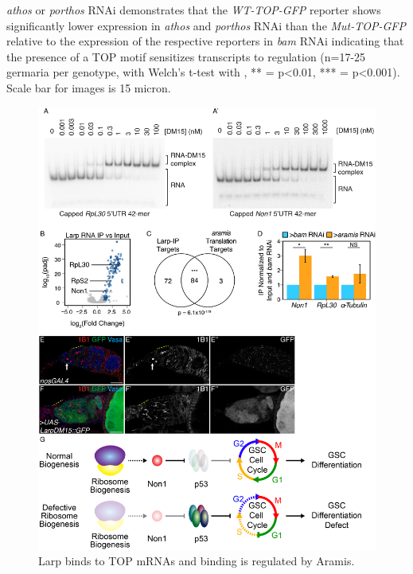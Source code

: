 \documentclass[12pt,oneside]{reedthesis}
\begin{document}
\emph{athos} or \emph{porthos} RNAi demonstrates that the \emph{WT-TOP-GFP} reporter
shows significantly lower expression in \emph{athos} and \emph{porthos} RNAi than
the \emph{Mut-TOP-GFP} relative to the expression of the respective reporters
in \emph{bam} RNAi indicating that the presence of a TOP motif sensitizes
transcripts to regulation (n=17-25 germaria per genotype, with Welch's
t-test with , ** = p\textless0.01, *** = p\textless0.001). Scale bar for images
is 15 micron.
\begin{figure}

{\centering \includegraphics[width=6.5 in,height=8.9375 in]{./figure/Ribosome Biogenesis/Ribosome Biogenesis 7} 

}

\caption[Larp binds to TOP mRNAs and binding is regulated by Aramis.]{Larp binds to TOP mRNAs and binding is regulated by Aramis.}\label{fig:unnamed-chunk-18}
\end{figure}
\textbf{\hfill\break
}
\end{document}
